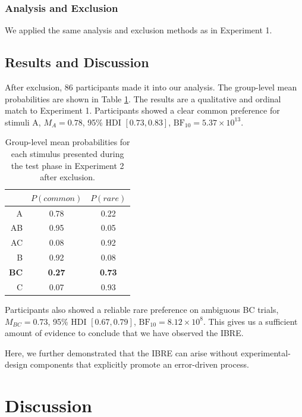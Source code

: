 \documentclass[10pt,letterpaper]{article}
\begin{document}
\subsubsection{Analysis and Exclusion}

We applied the same analysis and exclusion methods as in Experiment 1.

\subsection{Results and Discussion}

After exclusion, 86 participants made it into our analysis.
The group-level mean probabilities are shown in Table \ref{tab:results-exp2}.
The results are a qualitative and ordinal match to Experiment 1.
Participants showed a clear common preference for stimuli A, $M_{A} = 0.78$, 95\% HDI $[0.73, 0.83]$, $\mathrm{BF}_{10} = 5.37 \times 10^{13}$.

\begin{table}[H]
  \begin{center}
    \caption{Group-level mean probabilities for each stimulus presented during the test phase in Experiment 2 after exclusion.\\}
    \label{tab:results-exp2}
    \vskip 0.12in
    \begin{tabular}{rcc}
      \hline
       & $P(common)$ & $P(rare)$ \\
       \hline
      A & 0.78 & 0.22\\
      AB & 0.95 & 0.05\\
      AC & 0.08 & 0.92\\
      B & 0.92 & 0.08\\
      \textbf{BC} & \textbf{0.27} & \textbf{0.73}\\
      C & 0.07 & 0.93\\
    \end{tabular}
  \end{center}
\end{table}

Participants also showed a reliable rare preference on ambiguous BC trials, $M_{BC} = 0.73$, 95\% HDI $[0.67, 0.79]$, $\mathrm{BF}_{10} = 8.12 \times 10^{8}$.
This gives us a sufficient amount of evidence to conclude that we have observed the IBRE.

Here, we further demonstrated that the IBRE can arise without experimental-design components that explicitly promote an error-driven process.

\section{Discussion}
\end{document}

